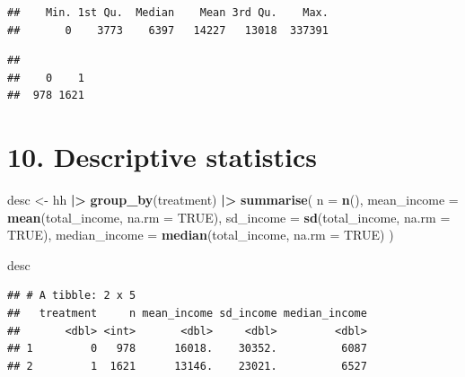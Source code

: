 \documentclass[
]{article}
\newenvironment{Shaded}{\begin{snugshade}}{\end{snugshade}}
\newcommand{\AttributeTok}[1]{\textcolor[rgb]{0.13,0.29,0.53}{#1}}
\newcommand{\ConstantTok}[1]{\textcolor[rgb]{0.56,0.35,0.01}{#1}}
\newcommand{\FunctionTok}[1]{\textcolor[rgb]{0.13,0.29,0.53}{\textbf{#1}}}
\newcommand{\NormalTok}[1]{#1}
\newcommand{\OtherTok}[1]{\textcolor[rgb]{0.56,0.35,0.01}{#1}}
\newcommand{\SpecialCharTok}[1]{\textcolor[rgb]{0.81,0.36,0.00}{\textbf{#1}}}
\begin{document}
\begin{Shaded}
\end{Shaded}

\begin{verbatim}
##    Min. 1st Qu.  Median    Mean 3rd Qu.    Max. 
##       0    3773    6397   14227   13018  337391
\end{verbatim}

\begin{Shaded}
\end{Shaded}

\begin{verbatim}
## 
##    0    1 
##  978 1621
\end{verbatim}

\section{10. Descriptive statistics}\label{descriptive-statistics}

\begin{Shaded}
\begin{Highlighting}[]
\NormalTok{desc }\OtherTok{\textless{}{-}}\NormalTok{ hh }\SpecialCharTok{|\textgreater{}}
  \FunctionTok{group\_by}\NormalTok{(treatment) }\SpecialCharTok{|\textgreater{}}
  \FunctionTok{summarise}\NormalTok{(}
    \AttributeTok{n =} \FunctionTok{n}\NormalTok{(),}
    \AttributeTok{mean\_income   =} \FunctionTok{mean}\NormalTok{(total\_income, }\AttributeTok{na.rm =} \ConstantTok{TRUE}\NormalTok{),}
    \AttributeTok{sd\_income     =} \FunctionTok{sd}\NormalTok{(total\_income, }\AttributeTok{na.rm =} \ConstantTok{TRUE}\NormalTok{),}
    \AttributeTok{median\_income =} \FunctionTok{median}\NormalTok{(total\_income, }\AttributeTok{na.rm =} \ConstantTok{TRUE}\NormalTok{)}
\NormalTok{  )}

\NormalTok{desc}
\end{Highlighting}
\end{Shaded}

\begin{verbatim}
## # A tibble: 2 x 5
##   treatment     n mean_income sd_income median_income
##       <dbl> <int>       <dbl>     <dbl>         <dbl>
## 1         0   978      16018.    30352.          6087
## 2         1  1621      13146.    23021.          6527
\end{verbatim}
\end{document}

